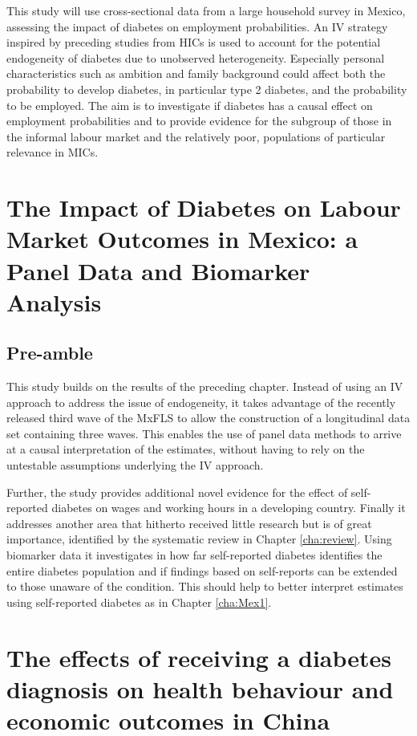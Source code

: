 This study will use cross-sectional data from a large household survey in Mexico, assessing the impact of diabetes on employment probabilities. An \ac{IV} strategy inspired by preceding studies from \acp{HIC} is used to account for the potential endogeneity of diabetes due to unobserved heterogeneity. Especially personal characteristics such as ambition and family background could affect both the probability to develop diabetes, in particular type 2 diabetes, and the probability to be employed. The aim is to investigate if diabetes has a causal effect on employment probabilities and to provide evidence for the subgroup of those in the informal labour market and the relatively poor, populations of particular relevance in \acp{MIC}.

\chapter{\label{cha:Mex2}The Impact of Diabetes on Labour Market Outcomes in Mexico: a Panel Data and Biomarker Analysis}
\section*{Pre-amble}

This study builds on the results of the preceding chapter. Instead of using an \ac{IV} approach to address the issue of endogeneity, it takes advantage of the recently released third wave of the \ac{MxFLS} to allow the construction of a longitudinal data set containing three waves. This enables the use of panel data methods to arrive at a causal interpretation of the estimates, without having to rely on the untestable assumptions underlying the \ac{IV} approach.

Further, the study provides additional novel evidence for the effect of self-reported diabetes on wages and working hours in a developing country. Finally it addresses another area that hitherto received little research but is of great importance, identified by the systematic review in Chapter \ref{cha:review}. Using biomarker data it investigates in how far self-reported diabetes identifies the entire diabetes population and if findings based on self-reports can be extended to those unaware of the condition. This should help to better interpret estimates using self-reported diabetes as in Chapter \ref{cha:Mex1}.


\chapter{\label{cha:China}The effects of receiving a diabetes diagnosis on health behaviour and economic outcomes in China}
